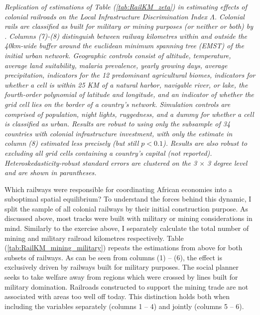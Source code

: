 \documentclass[11pt, oneside]{article}   	%
\let\oldref\ref
\renewcommand{\ref}[1]{(\oldref{#1})}
\newcommand{\mysubcaption}[1]{
\justify
\begin{spacing}{0.7}
\textit{\footnotesize #1}
\end{spacing}}
\begin{document}
\begin{table}[t]
{}

\mysubcaption{Replication of estimations of Table \ref{tab:RailKM_zeta} in estimating effects of colonial railroads on the Local Infrastructure Discrimination Index $\Lambda$. Colonial rails are classified as built for military or mining purposes (or neither or both) by \cite{jedwab_permanent_2016}. Columns (7)-(8) distinguish between railway kilometres within and outside the 40km-wide buffer around the euclidean minimum spanning tree (EMST) of the initial urban network. Geographic controls consist of altitude, temperature, average land suitability, malaria prevalence, yearly growing days, average precipitation, indicators for the 12 predominant agricultural biomes, indicators for whether a cell is within 25 KM of a natural harbor, navigable river, or lake, the fourth-order polynomial of latitude and longitude, and an indicator of whether the grid cell lies on the border of a country's network. Simulation controls are comprised of population, night lights, ruggedness, and a dummy for whether a cell is classified as urban. Results are robust to using only the subsample of 34 countries with colonial infrastructure investment, with only the estimate in column (8) estimated less precisely (but still $p<0.1$). Results are also robust to excluding all grid cells containing a country's capital (not reported). Heteroskedasticity-robust standard errors are clustered on the 3 $\times$ 3 degree level and are shown in parantheses.}
\end{table}

Which railways were responsible for coordinating African economies into a suboptimal spatial equilibrium? To understand the forces behind this dynamic, I split the sample of all colonial railways by their initial construction purpose. As discussed above, most tracks were built with military or mining considerations in mind. Similarly to the exercise above, I separately calculate the total number of mining and military railroad kilometres respectively. Table \ref{tab:RailKM_mining_military} repeats the estimations from above for both subsets of railways. As can be seen from columns (1) -- (6), the effect is exclusively driven by railways built for military purposes. The social planner seeks to take welfare away from regions which were crossed by lines built for military domination. Railroads constructed to support the mining trade are not associated with areas too well off today. This distinction holds both when including the variables separately (columns 1 -- 4) and jointly (columns 5 -- 6).
\end{document}
